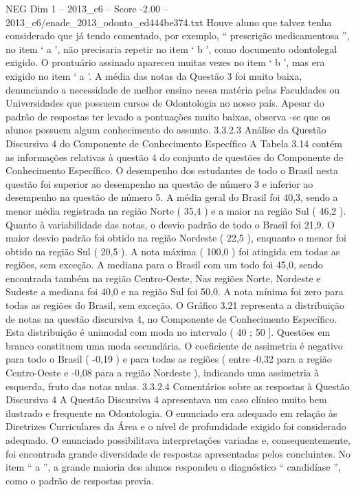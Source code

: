 \begin{textsample}{NEG Dim 1 – 2013\_c6 – Score -2.00 – 2013\_c6/enade\_2013\_odonto\_ed444be374.txt}
Houve aluno que talvez tenha considerado que já tendo comentado, por exemplo, “ prescrição medicamentosa ”, no item ‘ a ’, não precisaria repetir no item ‘ b ’, como documento odontolegal exigido.
O prontuário assinado apareceu muitas vezes no item ‘ b ’, mas era exigido no item ‘ a ’.
A média das notas da Questão 3 foi muito baixa, denunciando a necessidade de melhor ensino nessa matéria pelas Faculdades ou Universidades que possuem cursos de Odontologia no nosso país.
Apesar do padrão de respostas ter levado a pontuações muito baixas, observa -se que os alunos possuem algum conhecimento do assunto. 3.3.2.3 Análise da Questão Discursiva 4 do Componente de Conhecimento Específico A Tabela 3.14 contém as informações relativas à questão 4 do conjunto de questões do Componente de Conhecimento Específico.
O desempenho dos estudantes de todo o Brasil nesta questão foi superior ao desempenho na questão de número 3 e inferior ao desempenho na questão de número 5.
A média geral do Brasil foi 40,3, sendo a menor média registrada na região Norte ( 35,4 ) e a maior na região Sul ( 46,2 ).
Quanto à variabilidade das notas, o desvio padrão de todo o Brasil foi 21,9.
O maior desvio padrão foi obtido na região Nordeste ( 22,5 ), enquanto o menor foi obtido na região Sul ( 20,5 ).
A nota máxima ( 100,0 ) foi atingida em todas as regiões, sem exceção.
A mediana para o Brasil com um todo foi 45,0, sendo encontrada também na região Centro-Oeste, Nas regiões Norte, Nordeste e Sudeste a mediana foi 40,0 e na região Sul foi 50,0.
A nota mínima foi zero para todas as regiões do Brasil, sem exceção.
O Gráfico 3.21 representa a distribuição de notas na questão discursiva 4, no Componente de Conhecimento Específico.
Esta distribuição é unimodal com moda no intervalo ( 40 ; 50 ].
Questões em branco constituem uma moda secundária.
O coeficiente de assimetria é negativo para todo o Brasil ( -0,19 ) e para todas as regiões ( entre -0,32 para a região Centro-Oeste e -0,08 para a região Nordeste ), indicando uma assimetria à esquerda, fruto das notas nulas. 3.3.2.4 Comentários sobre as respostas à Questão Discursiva 4 A Questão Discursiva 4 apresentava um caso clínico muito bem ilustrado e frequente na Odontologia.
O enunciado era adequado em relação às Diretrizes Curriculares da Área e o nível de profundidade exigido foi considerado adequado.
O enunciado possibilitava interpretações variadas e, consequentemente, foi encontrada grande diversidade de respostas apresentadas pelos concluintes.
No item “ a ”, a grande maioria dos alunos respondeu o diagnóstico “ candidíase ”, como o padrão de respostas previa.

\end{textsample}
